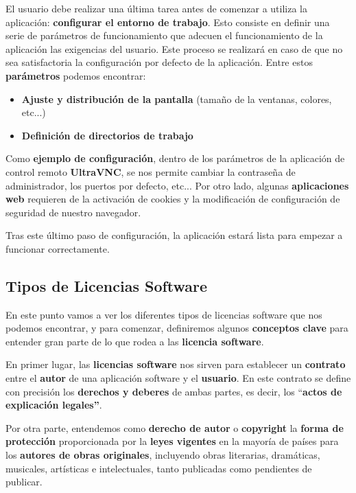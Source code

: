 El usuario debe realizar una última tarea antes de comenzar a utiliza la aplicación: \textbf{configurar el entorno de trabajo}. Esto consiste en definir una serie de parámetros de funcionamiento que adecuen el funcionamiento de la aplicación las exigencias del usuario. Este proceso se realizará en caso de que no sea satisfactoria la configuración por defecto de la aplicación. Entre estos \textbf{parámetros} podemos encontrar:

\begin{itemize}
    \item \textbf{Ajuste y distribución de la pantalla} (tamaño de la ventanas, colores, etc...)
    \item \textbf{Definición de directorios de trabajo}
\end{itemize}

Como \textbf{ejemplo de configuración}, dentro de los parámetros de la aplicación de control remoto \textbf{UltraVNC}, se nos permite cambiar la contraseña de administrador, los puertos por defecto, etc... Por otro lado, algunas \textbf{aplicaciones web} requieren de la activación de cookies y la modificación de configuración de seguridad de nuestro navegador.

Tras este último paso de configuración, la aplicación estará lista para empezar a funcionar correctamente.

\subsection{Tipos de Licencias Software}
En este punto vamos a ver los diferentes tipos de licencias software que nos podemos encontrar, y para comenzar, definiremos algunos \textbf{conceptos clave} para entender gran parte de lo que rodea a las \textbf{licencia software}.

En primer lugar, las \textbf{licencias software} nos sirven para establecer un \textbf{contrato} entre el \textbf{autor} de una aplicación software y el \textbf{usuario}. En este contrato se define con precisión los \textbf{derechos y deberes} de ambas partes, es decir, los ``\textbf{actos de explicación legales''}.

Por otra parte, entendemos como \textbf{derecho de autor} o \textbf{copyright} la \textbf{forma de protección} proporcionada por la \textbf{leyes vigentes} en la mayoría de países para los \textbf{autores de obras originales}, incluyendo obras literarias, dramáticas, musicales, artísticas e intelectuales, tanto publicadas como pendientes de publicar.

